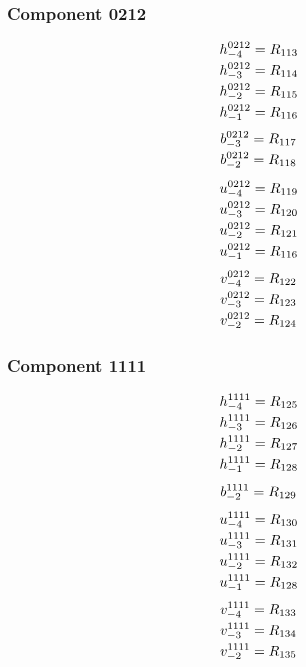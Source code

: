 \documentclass[11pt,a4paper]{article}
\begin{document}
\subsubsection{Component 0212}
\begin{equation}
\shortstack[l]{$\displaystyle h^{0212}_{-4}=R_{113}$\\
$\displaystyle h^{0212}_{-3}=R_{114}$\\
$\displaystyle h^{0212}_{-2}=R_{115}$\\
$\displaystyle h^{0212}_{-1}=R_{116}$}
\label{eq:cat-map-34}
\end{equation}
\begin{equation}
\shortstack[l]{$\displaystyle b^{0212}_{-3}=R_{117}$\\
$\displaystyle b^{0212}_{-2}=R_{118}$}
\label{eq:cat-map-35}
\end{equation}
\begin{equation}
\shortstack[l]{$\displaystyle u^{0212}_{-4}=R_{119}$\\
$\displaystyle u^{0212}_{-3}=R_{120}$\\
$\displaystyle u^{0212}_{-2}=R_{121}$\\
$\displaystyle u^{0212}_{-1}=R_{116}$}
\label{eq:cat-map-36}
\end{equation}
\begin{equation}
\shortstack[l]{$\displaystyle v^{0212}_{-4}=R_{122}$\\
$\displaystyle v^{0212}_{-3}=R_{123}$\\
$\displaystyle v^{0212}_{-2}=R_{124}$}
\label{eq:cat-map-37}
\end{equation}
\subsubsection{Component 1111}
\begin{equation}
\shortstack[l]{$\displaystyle h^{1111}_{-4}=R_{125}$\\
$\displaystyle h^{1111}_{-3}=R_{126}$\\
$\displaystyle h^{1111}_{-2}=R_{127}$\\
$\displaystyle h^{1111}_{-1}=R_{128}$}
\label{eq:cat-map-38}
\end{equation}
\begin{equation}
\shortstack[l]{$\displaystyle b^{1111}_{-2}=R_{129}$}
\label{eq:cat-map-39}
\end{equation}
\begin{equation}
\shortstack[l]{$\displaystyle u^{1111}_{-4}=R_{130}$\\
$\displaystyle u^{1111}_{-3}=R_{131}$\\
$\displaystyle u^{1111}_{-2}=R_{132}$\\
$\displaystyle u^{1111}_{-1}=R_{128}$}
\label{eq:cat-map-40}
\end{equation}
\begin{equation}
\shortstack[l]{$\displaystyle v^{1111}_{-4}=R_{133}$\\
$\displaystyle v^{1111}_{-3}=R_{134}$\\
$\displaystyle v^{1111}_{-2}=R_{135}$}
\label{eq:cat-map-41}
\end{equation}
\end{document}
